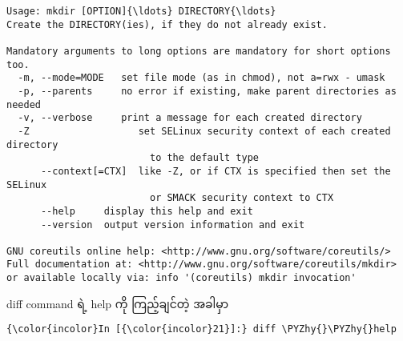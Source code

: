 \documentclass[11pt]{article}
\def\PYZhy{\char`\-}
\begin{document}
    \begin{Verbatim}[commandchars=\\\{\}]
Usage: mkdir [OPTION]{\ldots} DIRECTORY{\ldots}
Create the DIRECTORY(ies), if they do not already exist.

Mandatory arguments to long options are mandatory for short options too.
  -m, --mode=MODE   set file mode (as in chmod), not a=rwx - umask
  -p, --parents     no error if existing, make parent directories as needed
  -v, --verbose     print a message for each created directory
  -Z                   set SELinux security context of each created directory
                         to the default type
      --context[=CTX]  like -Z, or if CTX is specified then set the SELinux
                         or SMACK security context to CTX
      --help     display this help and exit
      --version  output version information and exit

GNU coreutils online help: <http://www.gnu.org/software/coreutils/>
Full documentation at: <http://www.gnu.org/software/coreutils/mkdir>
or available locally via: info '(coreutils) mkdir invocation'

    \end{Verbatim}

    diff command ရဲ့ help ကို ကြည့်ချင်တဲ့ အခါမှာ

    \begin{Verbatim}[commandchars=\\\{\}]
{\color{incolor}In [{\color{incolor}21}]:} diff \PYZhy{}\PYZhy{}help
\end{Verbatim}
\end{document}
